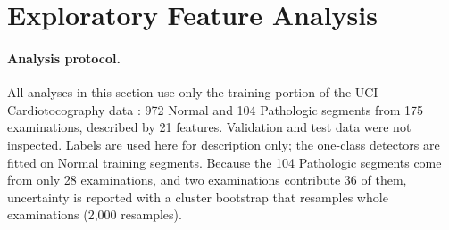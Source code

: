 \section{Exploratory Feature Analysis}
\label{sec:eda}

\paragraph{Analysis protocol.}
All analyses in this section use only the training portion of the UCI
Cardiotocography data \citep{campos2000ctg}: 972 Normal and 104 Pathologic
segments from 175 examinations, described by 21 features. Validation and test
data were not inspected. Labels are used here for description only; the
one-class detectors are fitted on Normal training segments. Because the 104
Pathologic segments come from only 28 examinations, and two examinations
contribute 36 of them, uncertainty is reported with a cluster bootstrap that
resamples whole examinations (2{,}000 resamples).

